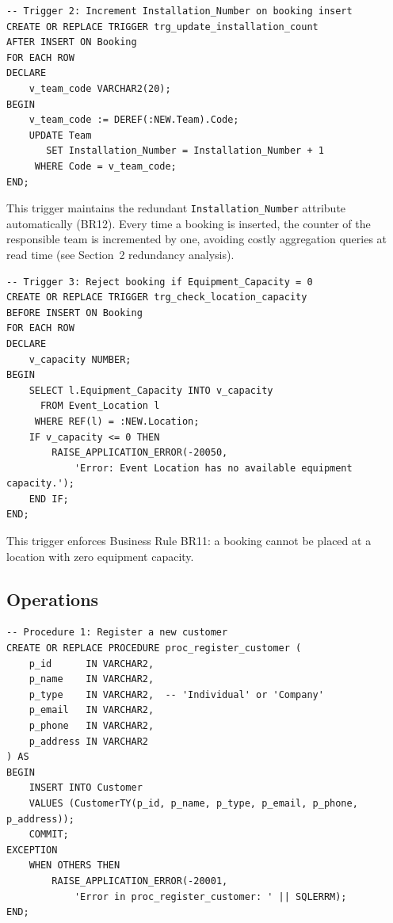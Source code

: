\begin{lstlisting}
-- Trigger 2: Increment Installation_Number on booking insert
CREATE OR REPLACE TRIGGER trg_update_installation_count
AFTER INSERT ON Booking
FOR EACH ROW
DECLARE
    v_team_code VARCHAR2(20);
BEGIN
    v_team_code := DEREF(:NEW.Team).Code;
    UPDATE Team
       SET Installation_Number = Installation_Number + 1
     WHERE Code = v_team_code;
END;
\end{lstlisting}

This trigger maintains the redundant \texttt{Installation\_Number} attribute automatically (BR12).
Every time a booking is inserted, the counter of the responsible team is incremented by one,
avoiding costly aggregation queries at read time (see Section~2 redundancy analysis).

\begin{lstlisting}
-- Trigger 3: Reject booking if Equipment_Capacity = 0
CREATE OR REPLACE TRIGGER trg_check_location_capacity
BEFORE INSERT ON Booking
FOR EACH ROW
DECLARE
    v_capacity NUMBER;
BEGIN
    SELECT l.Equipment_Capacity INTO v_capacity
      FROM Event_Location l
     WHERE REF(l) = :NEW.Location;
    IF v_capacity <= 0 THEN
        RAISE_APPLICATION_ERROR(-20050,
            'Error: Event Location has no available equipment capacity.');
    END IF;
END;
\end{lstlisting}

This trigger enforces Business Rule BR11: a booking cannot be placed at a location with zero equipment capacity.

\subsection{Operations}

\begin{lstlisting}
-- Procedure 1: Register a new customer
CREATE OR REPLACE PROCEDURE proc_register_customer (
    p_id      IN VARCHAR2,
    p_name    IN VARCHAR2,
    p_type    IN VARCHAR2,  -- 'Individual' or 'Company'
    p_email   IN VARCHAR2,
    p_phone   IN VARCHAR2,
    p_address IN VARCHAR2
) AS
BEGIN
    INSERT INTO Customer
    VALUES (CustomerTY(p_id, p_name, p_type, p_email, p_phone, p_address));
    COMMIT;
EXCEPTION
    WHEN OTHERS THEN
        RAISE_APPLICATION_ERROR(-20001,
            'Error in proc_register_customer: ' || SQLERRM);
END;
\end{lstlisting}


